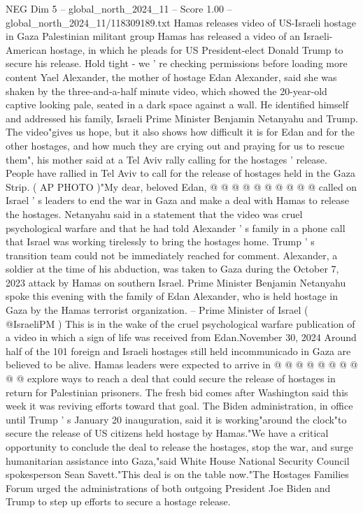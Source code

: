 \begin{textsample}{NEG Dim 5 – global\_north\_2024\_11 – Score 1.00 – global\_north\_2024\_11/118309189.txt}  \label{ex:f5_neg_414}
Hamas releases video of US-Israeli hostage in Gaza Palestinian militant group Hamas has released a video of an Israeli-American hostage, in which he pleads for US President-elect Donald Trump to secure his release.
Hold tight - we ' re checking permissions before loading more content Yael Alexander, the mother of hostage Edan Alexander, said she was shaken by the three-and-a-half minute video, which showed the 20-year-old captive looking pale, seated in a dark space against a wall.
He identified himself and addressed his family, Israeli Prime Minister Benjamin Netanyahu and Trump.
The video"gives us hope, but it also shows how difficult it is for Edan and for the other hostages, and how much they are crying out and praying for us to rescue them", his mother said at a Tel Aviv rally calling for the hostages ' release.
People have rallied in Tel Aviv to call for the release of hostages held in the Gaza Strip. ( AP PHOTO )"My dear, beloved Edan, @ @ @ @ @ @ @ @ @ @ called on Israel ' s leaders to end the war in Gaza and make a deal with Hamas to release the hostages.
Netanyahu said in a statement that the video was cruel psychological warfare and that he had told Alexander ' s family in a phone call that Israel was working tirelessly to bring the hostages home.
Trump ' s transition team could not be immediately reached for comment.
Alexander, a soldier at the time of his abduction, was taken to Gaza during the October 7, 2023 attack by Hamas on southern Israel.
Prime Minister Benjamin Netanyahu spoke this evening with the family of Edan Alexander, who is held hostage in Gaza by the Hamas terrorist organization. -- Prime Minister of Israel ( @IsraeliPM ) This is in the wake of the cruel psychological warfare publication of a video in which a sign of life was received from Edan.November 30, 2024 Around half of the 101 foreign and Israeli hostages still held incommunicado in Gaza are believed to be alive.
Hamas leaders were expected to arrive in @ @ @ @ @ @ @ @ @ @ explore ways to reach a deal that could secure the release of hostages in return for Palestinian prisoners.
The fresh bid comes after Washington said this week it was reviving efforts toward that goal.
The Biden administration, in office until Trump ' s January 20 inauguration, said it is working"around the clock"to secure the release of US citizens held hostage by Hamas."We have a critical opportunity to conclude the deal to release the hostages, stop the war, and surge humanitarian assistance into Gaza,"said White House National Security Council spokesperson Sean Savett."This deal is on the table now."The Hostages Families Forum urged the administrations of both outgoing President Joe Biden and Trump to step up efforts to secure a hostage release.

\end{textsample}
